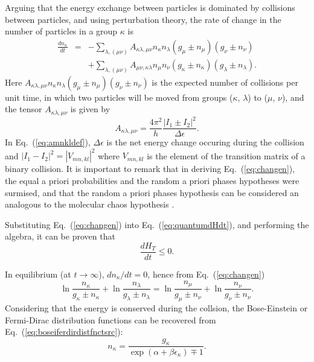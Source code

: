 Arguing that the energy exchange between particles is dominated by collisions between particles,
and using perturbation theory, the rate of change in the number of particles in a group $\kappa$ is
%
\begin{eqnarray}\label{eq:changen}
    \frac{d n_{\kappa}}{dt}&=&-\sum_{\lambda,(\mu \nu)}A_{\kappa\lambda,\mu\nu} n_{\kappa}n_{\lambda}(g_{\mu}\pm n_{\mu})(g_{\nu}\pm n_{\nu})\nonumber \\
    &&+\sum_{\lambda,(\mu \nu)}A_{\mu\nu,\kappa\lambda} n_{\mu}n_{\nu}(g_{\kappa}\pm n_{\kappa})(g_{\lambda}\pm n_{\lambda}).
\end{eqnarray}
%
Here $A_{\kappa\lambda,\mu\nu}n_{\kappa}n_{\lambda}(g_{\mu}\pm n_{\mu})(g_{\nu}\pm n_{\nu})$ is the
expected number of collisions per unit time, in which two particles will be moved from groups
($\kappa$, $\lambda$) to ($\mu$, $\nu$), and the tensor $A_{\kappa\lambda,\mu\nu}$ is given by
%
\begin{equation}\label{eq:amnkldef}
  A_{\kappa\lambda,\mu\nu}=\frac{4\pi^{2}}{h}\frac{|I_1\pm I_2|^2}{\Delta \epsilon}.
\end{equation}
%
In Eq.~(\ref{eq:amnkldef}), $\Delta\epsilon$ is the net energy change occuring during the
collision and $|I_1-I_2|^2=|V_{mn,kl}|^2$ where
$V_{mn,kl}$ is the element of the transition matrix of a binary collision.
It is important to remark that in deriving Eq.~(\ref{eq:changen}), the equal a priori
probabilities and the random a priori phases hypotheses were surmised, and that 
the random a priori phases hypothesis can be
considered an analogous to the molecular chaos hypothesis
\cite{bib:das2018}.

Substituting Eq.~(\ref{eq:changen}) into Eq.~(\ref{eq:quantumdHdt}), and performing
the algebra, it can be proven that
%
\begin{equation}
    \frac{dH_T}{dt}\leq 0.
\end{equation}
%

In equilibrium (at $t\to\infty$), $dn_{\kappa}/dt=0$, hence from Eq.~(\ref{eq:changen})
%
\begin{equation}\label{eq:boseiferdirdistfnctsrc}
    \ln \frac{n_{\kappa}}{g_{\kappa}\pm n_{\kappa}}+\ln \frac{n_{\lambda}}{g_{\lambda}\pm n_{\lambda}}=\ln \frac{n_{\mu}}{g_{\mu}\pm n_{\nu}}+\ln \frac{n_{\nu}}{g_{\nu}\pm n_{\nu}}.
\end{equation}
%
Considering that the energy is conserved during the collsion, the Bose-Einstein or Fermi-Dirac distribution
functions can be recovered from Eq.~(\ref{eq:boseiferdirdistfnctsrc}):
%
\begin{equation}
   n_{\kappa}=\frac{g_{\kappa}}{\exp(\alpha+\beta\epsilon_{\kappa})\mp1}.
\end{equation}
%


